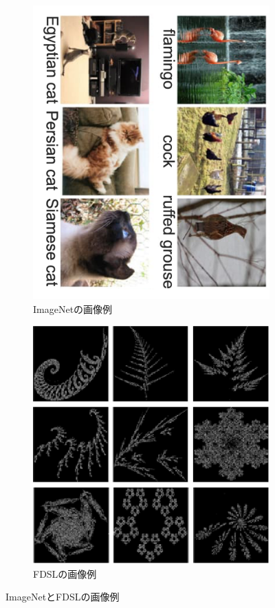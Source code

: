 \begin{figure}[tbp]
  \centering
  \begin{subfigure}[b]{0.45\linewidth}
    \centering
    \includegraphics[height=0.9\linewidth, keepaspectratio]{image/imagenet.png}
    \caption{ImageNetの画像例}
    \label{fig:imagenet}
  \end{subfigure}
  \hfill
  \begin{subfigure}[b]{0.45\linewidth}
    \centering
    \includegraphics[height=0.9\linewidth, keepaspectratio]{image/fdsl.eps}
    \caption{FDSLの画像例}
    \label{fig:fdsl}
  \end{subfigure}
  \caption{ImageNetとFDSLの画像例}
  \label{fig:transfer_learning}
\end{figure}

